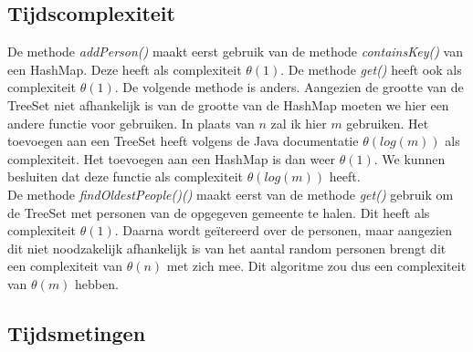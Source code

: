 \documentclass[10pt,a4paper]{report}
\begin{document}
\subsection*{Tijdscomplexiteit}
De methode \textsl{addPerson()} maakt eerst gebruik van de methode \textsl{containsKey()} van een HashMap. Deze heeft als complexiteit $\theta(1)$. De methode \textsl{get()} heeft ook als complexiteit $\theta(1)$. De volgende methode is anders. Aangezien de grootte van de TreeSet niet afhankelijk is van de grootte van de HashMap moeten we hier een andere functie voor gebruiken. In plaats van $n$ zal ik hier $m$ gebruiken. Het toevoegen aan een TreeSet heeft volgens de Java documentatie $\theta(log(m))$ als complexiteit. Het toevoegen aan een HashMap is dan weer $\theta(1)$. We kunnen besluiten dat deze functie als complexiteit $\theta(log(m))$ heeft.\\

De methode \textsl{findOldestPeople()()} maakt eerst van de methode \textsl{get()} gebruik om de TreeSet met personen van de opgegeven gemeente te halen. Dit heeft als complexiteit $\theta(1)$. Daarna wordt ge\"itereerd over de personen, maar aangezien dit niet noodzakelijk afhankelijk is van het aantal random personen brengt dit een complexiteit van $\theta(n)$ met zich mee. Dit algoritme zou dus een complexiteit van $\theta(m)$ hebben.
\newpage
\subsection*{Tijdsmetingen}
\end{document}
